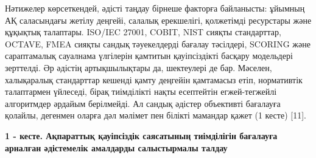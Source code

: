\begin{multicols}{2}
Нәтижелер көрсеткендей, әдісті таңдау бірнеше факторға байланысты:
ұйымның АҚ саласындағы жетілу деңгейі, салалық ерекшелігі, қолжетімді
ресурстары және құқықтық талаптары. ISO/IEC 27001, COBIT, NIST сияқты
стандарттар, OCTAVE, FMEA сияқты сандық тәуекелдерді бағалау тәсілдері,
SCORING және сараптамалық сауалнама үлгілерін қамтитын қауіпсіздікті
басқару модельдері зерттелді. Әр әдістің артықшылықтары да, шектеулері
де бар. Мәселен, халықаралық стандарттар кешенді қамту деңгейін
қамтамасыз етіп, нормативтік талаптармен үйлеседі, бірақ тиімділікті
нақты есептейтін егжей-тегжейлі алгоритмдер әрдайым берілмейді. Ал
сандық әдістер объективті бағалауға қолайлы, дегенмен оларға дәл мәлімет
пен білікті мамандар қажет (1 кесте) {[}11{]}.
\end{multicols}

{\bfseries 1 - кесте. Ақпараттық қауіпсіздік саясатының тиімділігін бағалауға арналған әдістемелік амалдарды салыстырмалы талдау}

